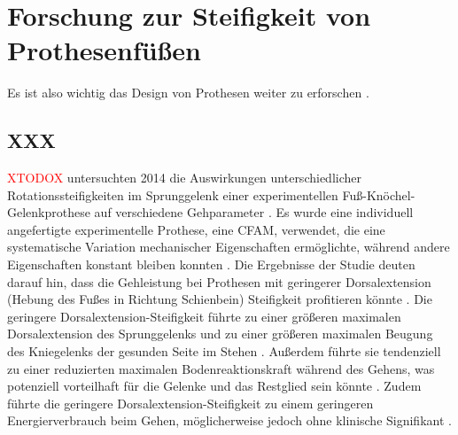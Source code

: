 \section{Forschung zur Steifigkeit von Prothesenfüßen} 
Es ist also wichtig das Design von Prothesen weiter zu erforschen \cite{Major.2014}.

\subsection{XXX}
\textcolor{red}{XTODOX} untersuchten 2014 die Auswirkungen unterschiedlicher Rotationssteifigkeiten im Sprunggelenk einer experimentellen Fuß-Knöchel-Gelenkprothese auf verschiedene Gehparameter \cite{Major.2014}.  %
Es wurde eine individuell angefertigte experimentelle Prothese, eine CFAM, verwendet, die eine systematische Variation mechanischer Eigenschaften ermöglichte, während andere Eigenschaften konstant bleiben konnten \cite{Major.2014}. 
Die Ergebnisse der Studie deuten darauf hin, dass die Gehleistung bei Prothesen mit geringerer Dorsalextension (Hebung des Fußes in Richtung Schienbein) Steifigkeit profitieren könnte \cite{Major.2014}. %
Die geringere Dorsalextension-Steifigkeit führte zu einer größeren maximalen Dorsalextension des Sprunggelenks und zu einer größeren maximalen Beugung des Kniegelenks der gesunden Seite im Stehen \cite{Major.2014}. Außerdem führte sie tendenziell zu einer reduzierten maximalen Bodenreaktionskraft während des Gehens, was potenziell vorteilhaft für die Gelenke und das Restglied sein könnte \cite{Major.2014}.  Zudem führte die geringere Dorsalextension-Steifigkeit zu einem geringeren Energierverbrauch beim Gehen, möglicherweise jedoch ohne klinische Signifikant \cite{Major.2014}.

